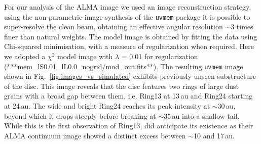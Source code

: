 \documentclass[letters,usenatbib,times]{mnras}
\begin{document}
For our analysis of the ALMA image we used an image reconstruction strategy, using the non-parametric image synthesis of the {\tt uvmem} package \citep{2006ApJ...639..951C, 2018A&C....22...16C} it is possible to super-resolve the clean beam, obtaining an effective angular resolution $\sim$3 times finer than natural weights. The model image is obtained by fitting the data using Chi-squared minimisation, with a measure of regularization when required. Here we adopted a $\chi^2$ model image with $\lambda$ = 0.01 for regularization (***mem\_lS0.01\_lL0.0\_nogrid/mod\_out.fits**). The resulting {\tt uvmem} image shown in Fig.~\ref{fig:images_vs_simulated} exhibits previously unseen substructure of the disc. This image reveals that the disc features two rings of large dust grains with a broad gap between them, i.e. Ring13 at 13\,au and Ring24 starting at 24\,au. The wide and bright Ring24 reaches its peak intensity at $\sim$30\,au, beyond which it drops steeply before breaking at $\sim$35\,au into a shallow tail. While this is the first observation of Ring13, \citet{Ru_z_Rodr_guez_2019} did anticipate its existence as their ALMA continuum image showed a distinct excess between $\sim$10 and 17\,au.
\end{document}
